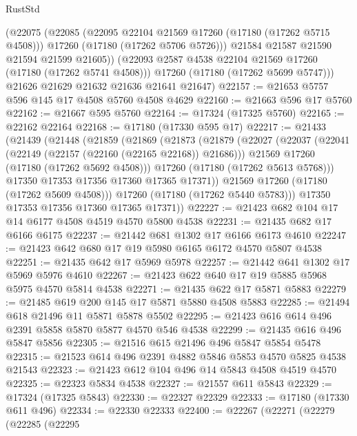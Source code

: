 \begin{lexlean}{RustStd}
\begin{coremodule}
{\begin{coremodule}
{{{{{{{{{{{{{{{{{{{{{{{{{{{{{{{{{{{{{{{{{{{{{{{{{{{{{{{          (@22075
            (@22085
              (@22095 @22104 @21569 @17260 (@17180 (@17262 @5715 @4508)))
              @17260
              (@17180 (@17262 @5706 @5726)))
            @21584
            @21587
            @21590
            @21594
            @21599
            @21605))
        (@22093 @2587 @4538 @22104 @21569 @17260 (@17180 (@17262 @5741 @4508)))
        @17260
        (@17180 (@17262 @5699 @5747)))
      @21626
      @21629
      @21632
      @21636
      @21641
      @21647)
@22157 := @21653 @5757 @596 @145 @17 @4508 @5760 @4508 @4629
@22160 := @21663 @596 @17 @5760
@22162 := @21667 @595 @5760
@22164 := @17324 (@17325 @5760)
@22165 := @22162 @22164
@22168 := @17180 (@17330 @595 @17)
@22217 := @21433
    (@21439
      (@21448
        (@21859
          (@21869
            (@21873
              (@21879
                (@22027
                  (@22037
                    (@22041 (@22149 (@22157 (@22160 (@22165 @22168)) @21686)))
                    @21569
                    @17260
                    (@17180 (@17262 @5692 @4508)))
                  @17260
                  (@17180 (@17262 @5613 @5768)))
                @17350
                @17353
                @17356
                @17360
                @17365
                @17371))
            @21569
            @17260
            (@17180 (@17262 @5609 @4508)))
          @17260
          (@17180 (@17262 @5440 @5783)))
        @17350
        @17353
        @17356
        @17360
        @17365
        @17371))
@22227 := @21423 @682 @104 @17 @14 @6177 @4508 @4519 @4570 @5800 @4538
@22231 := @21435 @682 @17 @6166 @6175
@22237 := @21442 @681 @1302 @17 @6166 @6173 @4610
@22247 := @21423 @642 @680 @17 @19 @5980 @6165 @6172 @4570 @5807 @4538
@22251 := @21435 @642 @17 @5969 @5978
@22257 := @21442 @641 @1302 @17 @5969 @5976 @4610
@22267 := @21423 @622 @640 @17 @19 @5885 @5968 @5975 @4570 @5814 @4538
@22271 := @21435 @622 @17 @5871 @5883
@22279 := @21485 @619 @200 @145 @17 @5871 @5880 @4508 @5883
@22285 := @21494 @618 @21496 @11 @5871 @5878 @5502
@22295 := @21423 @616 @614 @496 @2391 @5858 @5870 @5877 @4570 @546 @4538
@22299 := @21435 @616 @496 @5847 @5856
@22305 := @21516 @615 @21496 @496 @5847 @5854 @5478
@22315 := @21523 @614 @496 @2391 @4882 @5846 @5853 @4570 @5825 @4538 @21543
@22323 := @21423 @612 @104 @496 @14 @5843 @4508 @4519 @4570
@22325 := @22323 @5834 @4538
@22327 := @21557 @611 @5843
@22329 := @17324 (@17325 @5843)
@22330 := @22327 @22329
@22333 := @17180 (@17330 @611 @496)
@22334 := @22330 @22333
@22400 := @22267
    (@22271
      (@22279
        (@22285
          (@22295
}}}}}}}}}}}}}}}}}}}}}}}}}}}}}}}}}}}}}}}}}}}}}}}}}}}}}}}
\end{coremodule}}
\end{coremodule}
\end{lexlean}
